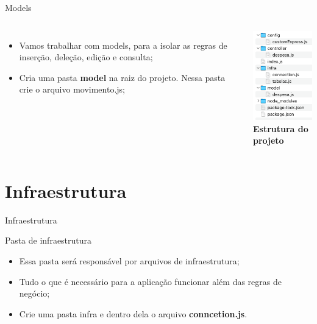\documentclass{beamer}
\begin{document}
    \begin{frame}[label=lists]{Models}
      \begin{columns}[onlytextwidth]
          \begin{itemize}
            \item Vamos trabalhar com models, para a isolar as regras de inserção, deleção, edição e consulta;
            \item Cria uma pasta \textbf{model} na raiz do projeto. Nessa pasta crie o arquivo movimento.js;
          \end{itemize}
            \includegraphics[width=40mm]{aulas/resources/aula10_2.png} \\
            \tiny{\textbf{Estrutura do projeto}}
      \end{columns}
    \end{frame}

\section{Infraestrutura}
    \begin{frame}[label=lists]{Infraestrutura}
    \begin{exampleblock}{Pasta de infraestrutura}
        	\begin{itemize}
	\item Essa pasta será responsável por arquivos de infraestrutura;
	\item Tudo o que é necessário para a aplicação funcionar além das regras de negócio;
	\item Crie uma pasta \alert{infra} e dentro dela o arquivo \textbf{conncetion.js}.
        	\end{itemize}
        	\tiny{\cite{nodejs2022api, moziladev2022js}}
      \end{exampleblock}
    \end{frame}
\end{document}
